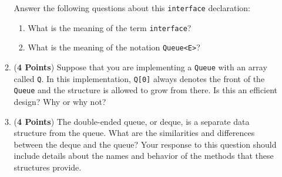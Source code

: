 \documentclass[12pt]{article}
\begin{document}
\begin{enumerate}
\begin{enumerate}
            \vspace*{-.3in}

            \noindent
            Answer the following questions about this {\tt interface}
            declaration:

            \begin{enumerate}

              \item What is the meaning of the term {\tt interface}?

              \item What is the meaning of the notation {\tt Queue<E>}?

            \end{enumerate}

          \item ({\bf 4 Points}) Suppose that you are implementing a {\tt Queue}
            with an array called {\tt Q}.  In this implementation, {\tt Q[0]}
            always denotes the front of the {\tt Queue} and the structure is
            allowed to grow from there.  Is this an efficient design? Why or why
            not?

          \item ({\bf 4 Points}) The double-ended queue, or deque, is a separate
            data structure from the queue.  What are the similarities and
            differences between the deque and the queue?  Your response to this
            question should include details about the names and behavior of the
            methods that these structures provide.


        \end{enumerate}

    \end{enumerate}

  
\end{document}
